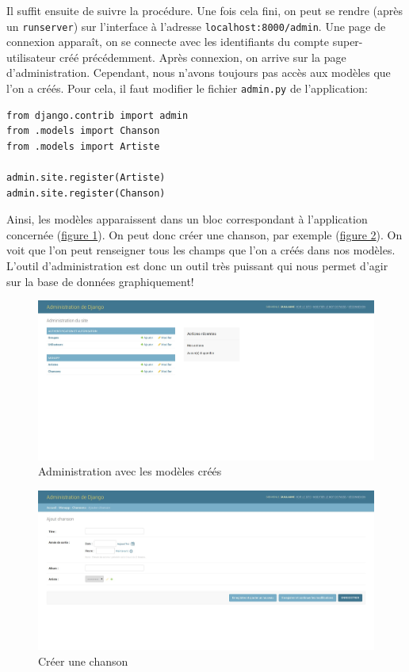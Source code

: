 \documentclass[a4paper, 10pt]{article}
\begin{document}
Il suffit ensuite de suivre la procédure. Une fois cela fini, on peut se rendre (après un \texttt{runserver}) sur l'interface à l'adresse \texttt{localhost:8000/admin}. Une page de connexion apparaît, on se connecte avec les identifiants du compte super-utilisateur créé précédemment. Après connexion, on arrive sur la page d'administration. Cependant, nous n'avons toujours pas accès aux modèles que l'on a créés. Pour cela, il faut modifier le fichier \texttt{admin.py} de l'application:
\begin{verbatim}
from django.contrib import admin
from .models import Chanson
from .models import Artiste

admin.site.register(Artiste)
admin.site.register(Chanson)
\end{verbatim}
Ainsi, les modèles apparaissent dans un bloc correspondant à l'application concernée (\hyperref[admin2]{figure 1}). On peut donc créer une chanson, par exemple (\hyperref[admin3]{figure 2}). On voit que l'on peut renseigner tous les champs que l'on a créés dans nos modèles. L'outil d’administration est donc un outil très puissant qui nous permet d'agir sur la base de données graphiquement!
\begin{figure}[h]
	\begin{center}
		\includegraphics[width=15 cm]{django/admin2.jpg}
		\caption{Administration avec les modèles créés}\label{admin2}
	\end{center}
\end{figure}
\begin{figure}[h]
	\begin{center}
		\includegraphics[width=15 cm]{django/admin3.jpg}
		\caption{Créer une chanson}\label{admin3}
	\end{center}
\end{figure}
\end{document}
